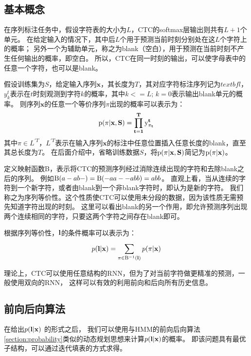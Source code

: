 \subsection{基本概念}

在序列标注任务中，假设字符表的大小为$L$，CTC的softmax层输出则共有$L+1$个单元。
在给定输入的情况下，其中后$L$个用于预测当前时刻分别处在这$L$个字符上的概率；
另外一个为辅助单元，称之为blank（空白），用于预测在当前时刻不产生任何输出的概率，即空白。
所以，CTC在同一时刻的输出，可以使字母表中的任意一个字符，也可以是blank。

假设训练集为$S$，给定输入序列$\textbf{x}$，其长度为$T$，其对应字符标注序列记为$textbf{l}$，
$y_k^t$表示在$t$时刻观测到字符$k$的概率，其中$k<=L$; $k=0$表示输出blank单元的概率。
则序列$\textbf{x}$的任意一个等价序列$\pi$出现的概率可以表示为：
\begin{equation}
\label{euqation:ctcpath}
{\rm{p}}(\pi |\bf{x},S) = \prod\limits_{t = 1}^T {{\rm{y}}_{{\pi _t}}^t}
\end{equation}
其中$\pi  \in {L^{'T}}$，$L^{'T}$表示在输入序列$\textbf{x}$的标注中任意位置插入任意长度的blank，直至其总长度为$T$。
在后面介绍中，省略训练数据$S$，将$\rm{p}(\pi |\bf{x},S)$简记为$\rm{p}(\pi|\bf{x})$。

定义映射函数{\rm B}，表示将CTC的预测序列经过消除连续出现的字符和去除blank之后的序列。
例如${\rm B}(a - ab - ) = {\rm B}( - aa -  - abb) = abb$。
直观上看，当从连续的字符到一个新字符，或者由blank到一个非blank字符时，即认为是新的字符。
我们称之为序列等价性。这个性质使CTC可以使用未分段的数据，因为该性质无需预先知道字符出现的时刻。
这里可以看出blank的另一个作用，即允许预测序列出现两个连续相同的字符，只要这两个字符之间存在blank即可。

根据序列等价性，$\bf{l}$的条件概率可以表示为：
\begin{equation}
\label{euqation:ctcallpath}
p({\bf{l}}|{\bf{x}}) = \sum\limits_{\pi  \in {{\rm B}^{ - 1}}({\bf{l}})}^{} {p(\pi |{\bf{x}})}
\end{equation}

理论上，CTC可以使用任意结构的RNN，但为了对当前字符做更精准的预测，一般使用双向的RNN，
这样可以有效的利用前向和后向所有历史信息。

\subsection{前向后向算法}

在给出$p({\bf{l}}|{\bf{x}})$ 的形式之后，
我们可以使用与HMM的前向后向算法\ref{section:probability}类似的动态规划思想来计算$p({\bf{l}}|{\bf{x}})$的概率。
即该问题具有最优子结构，可以通过迭代填表的方式求得。

